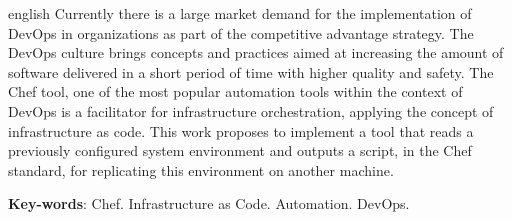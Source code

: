 \newpage\null\thispagestyle{empty}\newpage
\begin{resumo}[Abstract]
  \begin{otherlanguage*}{english}
    Currently there is a large market demand for the implementation
    of DevOps in organizations as part of the competitive advantage
    strategy. The DevOps culture brings concepts and practices aimed at increasing
    the amount of software delivered in a short period of time with higher quality
    and safety. The Chef tool, one of the most popular automation tools within the
    context of DevOps is a facilitator for infrastructure orchestration, applying
    the concept of infrastructure as code. This work proposes to implement a tool
    that reads a previously configured system environment and outputs a script,
    in the Chef standard, for replicating this environment on another machine.

    \vspace{\onelineskip}
    \noindent 
    \textbf{Key-words}: Chef. Infrastructure as Code. Automation. DevOps.
  \end{otherlanguage*}
\end{resumo}
